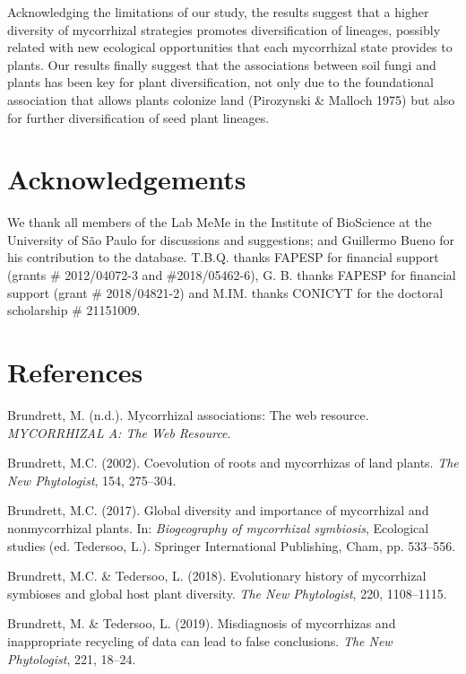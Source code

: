 \documentclass[12pt,]{article}
\begin{document}
Acknowledging the limitations of our study, the results suggest that a
higher diversity of mycorrhizal strategies promotes diversification of
lineages, possibly related with new ecological opportunities that each
mycorrhizal state provides to plants. Our results finally suggest that
the associations between soil fungi and plants has been key for plant
diversification, not only due to the foundational association that
allows plants colonize land (Pirozynski \& Malloch 1975) but also for
further diversification of seed plant lineages.

\hypertarget{acknowledgements}{%
\section{Acknowledgements}\label{acknowledgements}}

We thank all members of the Lab MeMe in the Institute of BioScience at
the University of São Paulo for discussions and suggestions; and
Guillermo Bueno for his contribution to the database. T.B.Q. thanks
FAPESP for financial support (grants \# 2012/04072-3 and
\#2018/05462-6), G. B. thanks FAPESP for financial support (grant \#
2018/04821-2) and M.IM. thanks CONICYT for the doctoral scholarship \#
21151009.

\hypertarget{references}{%
\section{References}\label{references}}

\hypertarget{refs}{}
\leavevmode\hypertarget{ref-brundrett_website_2008}{}%
Brundrett, M. (n.d.). Mycorrhizal associations: The web resource.
\emph{MYCORRHIZAL A: The Web Resource}.

\leavevmode\hypertarget{ref-brundrett_2002}{}%
Brundrett, M.C. (2002). Coevolution of roots and mycorrhizas of land
plants. \emph{The New Phytologist}, 154, 275--304.

\leavevmode\hypertarget{ref-brundrett_2017}{}%
Brundrett, M.C. (2017). Global diversity and importance of mycorrhizal
and nonmycorrhizal plants. In: \emph{Biogeography of mycorrhizal
symbiosis}, Ecological studies (ed. Tedersoo, L.). Springer
International Publishing, Cham, pp. 533--556.

\leavevmode\hypertarget{ref-brundrett_2018}{}%
Brundrett, M.C. \& Tedersoo, L. (2018). Evolutionary history of
mycorrhizal symbioses and global host plant diversity. \emph{The New
Phytologist}, 220, 1108--1115.

\leavevmode\hypertarget{ref-brundrett_2019}{}%
Brundrett, M. \& Tedersoo, L. (2019). Misdiagnosis of mycorrhizas and
inappropriate recycling of data can lead to false conclusions. \emph{The
New Phytologist}, 221, 18--24.
\end{document}
